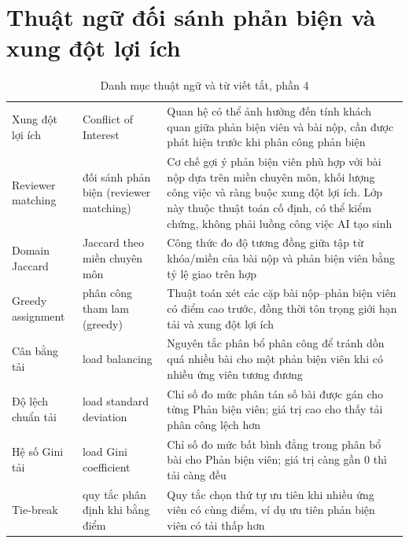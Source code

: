 \section*{Thuật ngữ đối sánh phản biện và xung đột lợi ích}

\begingroup
\setlength{\tabcolsep}{2pt}
\renewcommand{\arraystretch}{1.2}
\begin{longtable}{|C{0.16\textwidth}|P{0.22\textwidth}|P{0.55\textwidth}|}  \caption{Danh mục thuật ngữ và từ viết tắt, phần 4}\\
  \hline
       &        &     \\ \hline
  Xung đột lợi ích     &     Conflict of Interest     &     Quan hệ có thể ảnh hưởng đến tính khách quan giữa phản biện viên và bài nộp, cần được phát hiện trước khi phân công phản biện \\ \hline
  Reviewer matching      &      đối sánh phản biện (reviewer matching)      &      Cơ chế gợi ý phản biện viên phù hợp với bài nộp dựa trên miền chuyên môn, khối lượng công việc và ràng buộc xung đột lợi ích. Lớp này thuộc thuật toán cố định, có thể kiểm chứng, không phải luồng công việc AI tạo sinh \\ \hline
  Domain Jaccard     &     Jaccard theo miền chuyên môn     &     Công thức đo độ tương đồng giữa tập từ khóa/miền của bài nộp và phản biện viên bằng tỷ lệ giao trên hợp \\ \hline
  Greedy assignment      &      phân công tham lam (greedy)      &      Thuật toán xét các cặp bài nộp--phản biện viên có điểm cao trước, đồng thời tôn trọng giới hạn tải và xung đột lợi ích \\ \hline
  Cân bằng tải     &     load balancing     &     Nguyên tắc phân bổ phân công để tránh dồn quá nhiều bài cho một phản biện viên khi có nhiều ứng viên tương đương \\ \hline
  Độ lệch chuẩn tải      &      load standard deviation      &      Chỉ số đo mức phân tán số bài được gán cho từng Phản biện viên; giá trị cao cho thấy tải phân công lệch hơn \\ \hline
  Hệ số Gini tải     &     load Gini coefficient     &     Chỉ số đo mức bất bình đẳng trong phân bổ bài cho Phản biện viên; giá trị càng gần 0 thì tải càng đều \\ \hline
  Tie-\allowbreak break      &      quy tắc phân định khi bằng điểm      &      Quy tắc chọn thứ tự ưu tiên khi nhiều ứng viên có cùng điểm, ví dụ ưu tiên phản biện viên có tải thấp hơn \\ \hline

\end{longtable}
